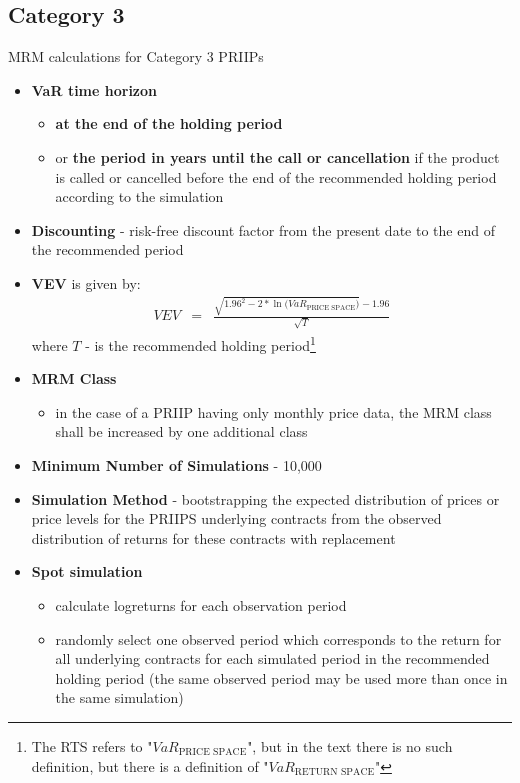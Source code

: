 \subsection{Category 3}
MRM calculations for Category 3 PRIIPs
\begin{itemize}
	\label{Sec:MrmCalculationForCategory3}
	\item \textbf{VaR time horizon}
	\begin{itemize}
		\item \textbf{\color{blue}at the end of the holding period}
		\item or \textbf{\color{blue}the period in years until the call or cancellation} if the product is
		called or cancelled before the end of the recommended holding period according to the simulation
	\end{itemize}
	\item \textbf{Discounting} - risk-free discount factor from the present date to the end of the recommended period
	\item \textbf{VEV} is given by:
	\begin{eqnarray}
		VEV &=& \frac{\sqrt{1.96^{2} - 2 * \ln{\Big(VaR_{\text{PRICE SPACE}}\Big)}} - 1.96}{\sqrt{T}}
	\end{eqnarray}
	where $T$ - is the recommended holding period\footnote{The RTS refers to "$VaR_{\text{PRICE SPACE}}$", but in the text there is no such definition, but there is a definition of "$VaR_{\text{RETURN SPACE}}$"}
	\item \textbf{MRM Class}
	\begin{itemize}
		\item in the case of a PRIIP having only monthly price data, the MRM class shall be increased by one additional class 
	\end{itemize}
	\item \textbf{Minimum Number of Simulations} - 10,000
	\item \textbf{Simulation Method} - bootstrapping the expected distribution of prices or price levels for the PRIIPS underlying contracts from the observed distribution of returns for these contracts with replacement
	\item \textbf{Spot simulation}
	\begin{itemize}
		\item calculate logreturns for each observation period
		\item randomly select one observed period which corresponds to the return for all underlying contracts for each simulated period in the recommended holding period (the same observed period may be used more than once in the same simulation)

\end{itemize}
\end{itemize}
